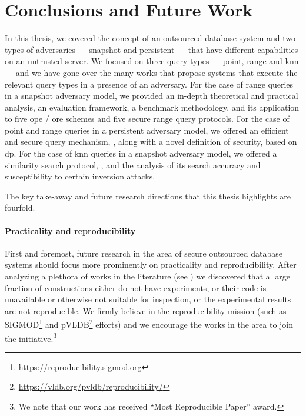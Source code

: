 \chapter{Conclusions and Future Work}
\thispagestyle{myheadings}

	In this thesis, we covered the concept of an outsourced database system and two types of adversaries --- snapshot and persistent --- that have different capabilities on an untrusted server.
	We focused on three query types --- point, range and \acrlong{knn} --- and we have gone over the many works that propose systems that execute the relevant query types in a presence of an adversary.
	For the case of range queries in a snapshot adversary model, we provided an in-depth theoretical and practical analysis, an evaluation framework, a benchmark methodology, and its application to five \acrshort{ope} / \acrshort{ore} schemes and five secure range query protocols.
	For the case of point and range queries in a persistent adversary model, we offered an efficient and secure query mechanism, \epsolute{}, along with a novel definition of security, based on \acrlong{dp}.
	For the case of \acrlong{knn} queries in a snapshot adversary model, we offered a similarity search protocol, \kanon{}, and the analysis of its search accuracy and susceptibility to certain inversion attacks.

	The key take-away and future research directions that this thesis highlights are fourfold.

	\subsubsection{Practicality and reproducibility}

		First and foremost, future research in the area of secure outsourced database systems should focus more prominently on practicality and reproducibility.
		After analyzing a plethora of works in the literature (see \cite{ore-benchmark-17,epsolute}) we discovered that a large fraction of constructions either do not have experiments, or their code is unavailable or otherwise not suitable for inspection, or the experimental results are not reproducible.
		We firmly believe in the reproducibility mission (such as SIGMOD\footnote{\url{https://reproducibility.sigmod.org}} and pVLDB\footnote{\url{https://vldb.org/pvldb/reproducibility/}} efforts) and we encourage the works in the area to join the initiative.\footnote{
			We note that our work \cite{ore-benchmark-17} has received ``Most Reproducible Paper'' award.
		}

